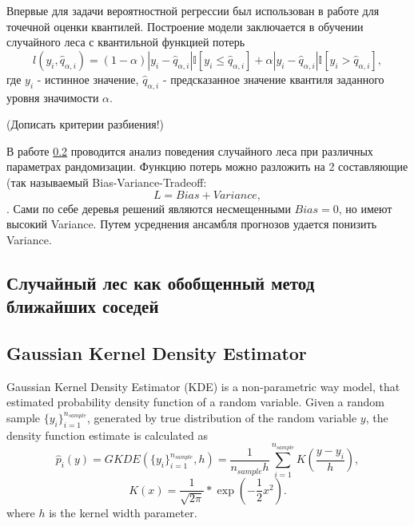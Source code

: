 \documentclass[fleqn,usenatbib]{mnras}
\begin{document}
Впервые для задачи вероятностной регрессии был использован в работе \cite{JMLR:v7:meinshausen06a} для точечной оценки квантилей. Построение модели заключается в обучении случайного леса с квантильной функцией потерь 
\begin{equation}\label{eq:quantile_loss}
    l(y_i, \hat{q}_{\alpha, i}) = (1-\alpha)|y_i - \hat{q}_{\alpha, i}|\mathbb{I}[y_i \leq \hat{q}_{\alpha, i}] + \alpha|y_i - \hat{q}_{\alpha, i}|\mathbb{I}[y_i > \hat{q}_{\alpha, i}],
\end{equation}
где $y_i$ - истинное значение, $\hat{q}_{\alpha, i}$ - предсказанное значение квантиля заданного уровня значимости $\alpha$.

(Дописать критерии разбиения!)

В работе \ref{} проводится анализ поведения случайного леса при различных параметрах рандомизации. Функцию потерь можно разложить на 2 составляющие (так называемый Bias-Variance-Tradeoff:
\begin{equation}\label{eq:bias-variance-tradeoff}
    L = Bias + Variance,
\end{equation}.
Сами по себе деревья решений являются несмещенными $Bias = 0$, но имеют высокий Variance. Путем усреднения ансамбля прогнозов удается понизить Variance.

\subsection{Случайный лес как обобщенный метод ближайших соседей}

\subsection{Gaussian Kernel Density Estimator}
Gaussian Kernel Density Estimator (KDE) is a non-parametric way model, that estimated probability density function of a random variable. Given a random sample $\{y_i\}_{i=1}^{n_{sample}}$, generated by true distribution of the random variable $y$, the density function estimate is calculated as\begin{equation}\label{eq:kde}
    \hat{p}_i (y) = GKDE(\{y_i\}_{i=1}^{n_{sample}}, h) = \frac{1}{n_{sample} h}\sum_{i=1}^{n_{sample}} K(\frac{y - y_i}{h}),
\end{equation}
\begin{equation}\label{eq:gaussian_kernel}
    K(x) = \frac{1}{\sqrt{2\pi}} * \exp{(-\frac{1}{2} x^2)}.
\end{equation}
where $h$ is the kernel width parameter.
\end{document}
